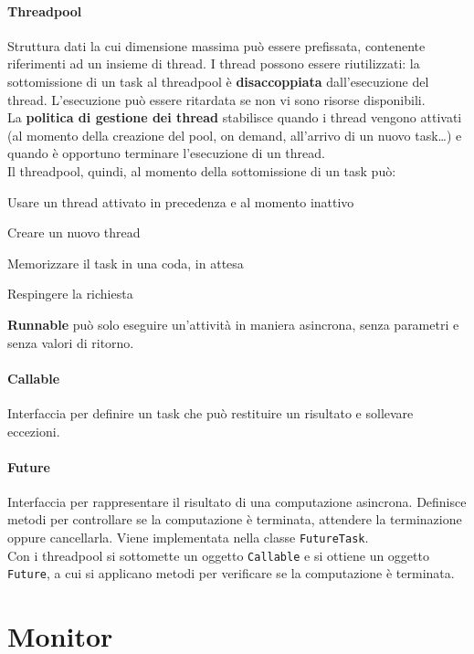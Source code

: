 \documentclass[10pt]{article}
\begin{document}
\paragraph{Threadpool} Struttura dati la cui dimensione massima può essere prefissata, contenente riferimenti ad un insieme di thread. I thread possono essere riutilizzati: la sottomissione di un task al threadpool è \textbf{disaccoppiata} dall'esecuzione del thread. L'esecuzione può essere ritardata se non vi sono risorse disponibili.\\
La \textbf{politica di gestione dei thread} stabilisce quando i thread vengono attivati (al momento della creazione del pool, on demand, all'arrivo di un nuovo task\ldots) e quando è opportuno terminare l'esecuzione di un thread.\\
Il threadpool, quindi, al momento della sottomissione di un task può:
\begin{list}{}{}
	\item Usare un thread attivato in precedenza e al momento inattivo
	\item Creare un nuovo thread
	\item Memorizzare il task in una coda, in attesa
	\item Respingere la richiesta
\end{list}
\textbf{Runnable} può solo eseguire un'attività in maniera asincrona, senza parametri e senza valori di ritorno.
\paragraph{Callable} Interfaccia per definire un task che può restituire un risultato e sollevare eccezioni.
\paragraph{Future} Interfaccia per rappresentare il risultato di una computazione asincrona. Definisce metodi per controllare se la computazione è terminata, attendere la terminazione oppure cancellarla. Viene implementata nella classe \texttt{FutureTask}.\\
Con i threadpool si sottomette un oggetto \texttt{Callable} e si ottiene un oggetto \texttt{Future}, a cui si applicano metodi per verificare se la computazione è terminata.
\section{Monitor}
\end{document}

